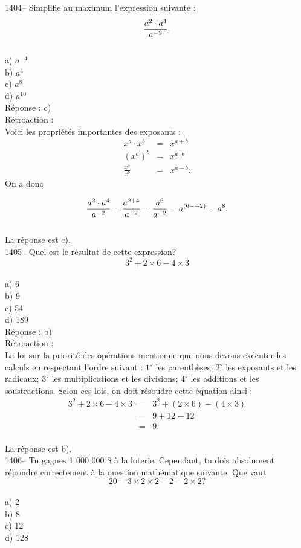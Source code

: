 1404-- Simplifie au maximum l'expression suivante :
$${\LARGE \frac {a^2\cdot a^4}{a^{-2}}}.$$\\
a) $a^{-4}$\\
b) $a^4$\\
c) $a^8$\\
d) $a^{10}$\\

R\'eponse : c)\\

R\'etroaction :\\
Voici les propri\'et\'es importantes des exposants :
\begin{eqnarray*}
x^a\cdot x^b&=&x^{a+b} \\ (x^a)^b&=&x^{a \cdot b} \\
\frac{x^a}{x^b}&=& x^{a-b}.
\end{eqnarray*}
On a donc

$${\LARGE \frac {a^2\cdot a^4}{a^{-2}}}={\LARGE \frac
{a^{2+4}}{a^{-2}}}={\LARGE \frac {a^6}{a^{-2}}}={\LARGE a^{(6-
-2)}=a^8}.$$\\
La r\'eponse est c).\\

1405-- Quel est le r\'esultat de cette expression?
$$3^2+2\times6-4\times3$$\\
a) 6\\
b) 9\\
c) 54\\
d) 189\\

R\'eponse : b)\\

R\'etroaction :\\
La loi sur la priorit\'e des op\'erations mentionne que nous devons
ex\'ecuter les calculs en respectant l'ordre suivant : \vskip 10pt
$1^{\circ}$ les parenth\`eses; \vskip 10pt $2^{\circ}$ les exposants
et les radicaux; \vskip 10pt $3^{\circ}$ les multiplications et les
divisions; \vskip 10pt $4^{\circ}$ les additions et les
soustractions. \vskip 25pt \noindent Selon ces lois, on doit
r\'esoudre cette \'equation ainsi :
\begin{eqnarray*}
3^2+2\times6-4\times3 & = & 3^2+(2\times6)-(4\times3) \\ & = &
9+12-12 \\ & = & 9.
\end{eqnarray*}\\
La r\'eponse est b).\\

1406-- Tu gagnes 1 000 000 \$ \`a la loterie. Cependant, tu dois
absolument r\'epondre correctement \`a la question math\'ematique
suivante. Que vaut
$$20-3\times2\times2-2-2\times2?$$ \\
a) 2\\
b) 8\\
c) 12\\
d) 128\\

